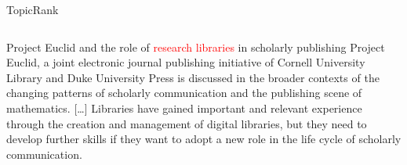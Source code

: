 \begin{frame}[label=topicrank]{TopicRank}
\begin{columns}
\begin{column}{.45\textwidth}
{\begin{textblock*}{.95\textwidth}
            \begin{exampleblock}{\footnotesize Project Euclid and the role of
                                 \textcolor{red}{research libraries} in
                                 scholarly publishing}
              \justifying
              \footnotesize Project Euclid, a joint electronic journal
              publishing initiative of \textcolor{BurntOrange}{Cornell University
              Library} and Duke University Press is discussed in the broader
              contexts of the changing patterns of scholarly communication and
              the publishing scene of mathematics. [\dots]
              \textcolor{BurntOrange}{Libraries} have gained important and relevant
              experience through the creation and management of
              \textcolor{BurntOrange}{digital libraries}, but they need to develop
              further skills if they want to adopt a new role in the life cycle
              of scholarly communication.
            \end{exampleblock}
          \end{textblock*}
        }


\end{column}
\end{columns}
\end{frame}
